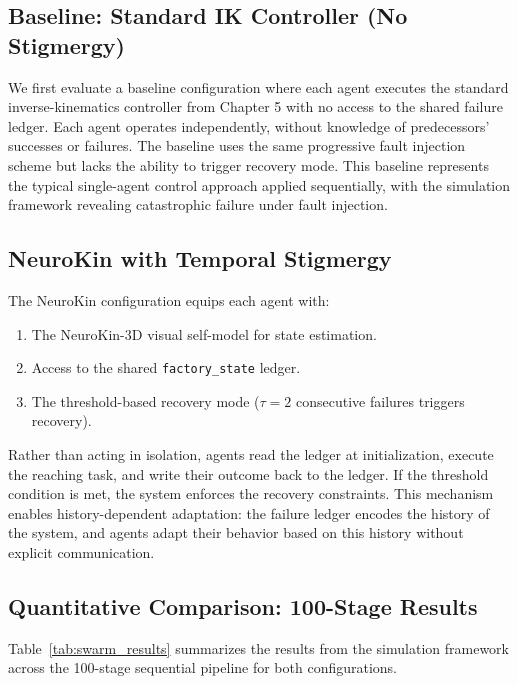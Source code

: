 \documentclass[12pt,a4paper,oneside]{report}
\begin{document}
\subsection{Baseline: Standard IK Controller (No Stigmergy)}

We first evaluate a baseline configuration where each agent executes the standard inverse-kinematics controller from Chapter 5 with no access to the shared failure ledger. Each agent operates independently, without knowledge of predecessors' successes or failures. The baseline uses the same progressive fault injection scheme but lacks the ability to trigger recovery mode. This baseline represents the typical single-agent control approach applied sequentially, with the simulation framework revealing catastrophic failure under fault injection.

\subsection{NeuroKin with Temporal Stigmergy}

The NeuroKin configuration equips each agent with:
\begin{enumerate}
    \item The NeuroKin-3D visual self-model for state estimation.
    \item Access to the shared \texttt{factory\_state} ledger.
    \item The threshold-based recovery mode ($\tau = 2$ consecutive failures triggers recovery).
\end{enumerate}

Rather than acting in isolation, agents read the ledger at initialization, execute the reaching task, and write their outcome back to the ledger. If the threshold condition is met, the system enforces the recovery constraints. This mechanism enables history-dependent adaptation: the failure ledger encodes the history of the system, and agents adapt their behavior based on this history without explicit communication.

\subsection{Quantitative Comparison: 100-Stage Results}

Table~\ref{tab:swarm_results} summarizes the results from the simulation framework across the 100-stage sequential pipeline for both configurations.
\end{document}
